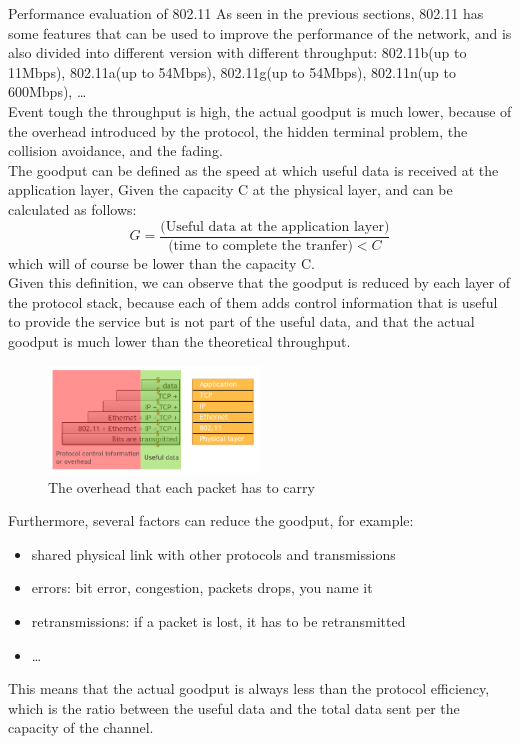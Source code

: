 \begin{section}{Performance evaluation of 802.11}
  As seen in the previous sections, 802.11 has some features that can be used to improve the
  performance of the network, and is also divided into different version with different 
  throughput: 802.11b(up to 11Mbps), 802.11a(up to 54Mbps), 802.11g(up to 54Mbps), 802.11n(up to 600Mbps),
  \dots\\
  Event tough the throughput is high, the actual goodput is much lower, because of the overhead
  introduced by the protocol, the hidden terminal problem, the collision avoidance, and the fading.\\
  The goodput can be defined as the speed at which useful data is received at the application layer,
  Given the capacity C at the physical layer, and can be calculated as follows:
  \begin{equation}
    G = \frac{\text{(Useful data at the application layer)}}{\text{(time to complete the tranfer)}<C}
  \end{equation}
  which will of course be lower than the capacity C.\\
  Given this definition, we can observe that the goodput is reduced by each layer of the protocol stack,
  because each of them adds control information that is useful to provide the service but is not part of
  the useful data, and that the actual goodput is much lower than the theoretical throughput.\\
  \begin{figure}[h]
    \centering
    \includegraphics[width=0.5\textwidth]{img/wireless/encapsulation overhead.png}
    \caption{The overhead that each packet has to carry}
  \end{figure}
  Furthermore, several factors can reduce the goodput, for example:
  \begin{itemize}
    \item shared physical link with other protocols and transmissions
    \item errors: bit error, congestion, packets drops, you name it
    \item retransmissions: if a packet is lost, it has to be retransmitted
    \item \dots 
  \end{itemize}
  This means that the actual goodput is always less than the protocol efficiency, which is the
  ratio between the useful data and the total data sent per the capacity of the channel.\\


\end{section}
